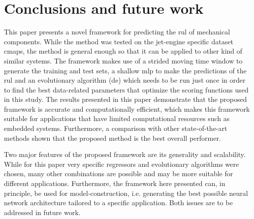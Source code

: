 \section{Conclusions and future work}
\label{sec:conclusions}

This paper presents a novel framework for predicting the \gls{rul} of mechanical components. While the method was tested on the jet-engine specific dataset \gls{cmaps}, the method is general enough so that it can be applied to other kind of similar systems. The framework makes use of a strided moving time window to generate the training and test sets, a shallow \gls{mlp} to make the predictions of the \gls{rul} and an evolutionary algorithm (\gls{de}) which needs to be run just once in order to find the best data-related parameters that optimize the scoring functions used in this study.  The results presented in this paper demonstrate that the proposed framework is accurate and computationally efficient, which makes this framework suitable for applications that have limited computational resources such as embedded systems. Furthermore, a comparison with other state-of-the-art methods shown that the proposed method is the best overall performer. 

Two major features of the proposed framework are its generality and scalability. While for this paper very specific regressors and evolutionary algorithms were chosen, many other combinations are possible and may be more suitable for different applications. Furthermore, the framework here presented can, in principle, be used for model-construction, i.e. generating the best possible neural network architecture tailored to a specific application. Both issues are to be addressed in future work.
